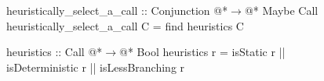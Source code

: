 \documentclass[12pt,a4paper]{report}
\begin{document}
\thispagestyle{empty}
\begin{figure}[h]
\begin{PseudoCode}[moredelim={[is][stringstyle]{@@}{@@}},
  moredelim={[is][\color{dkgreen}\bfseries]{@!}{@!}},
  moredelim={[is][\color{red}\bfseries]{!!}{!!}}]
heuristically_select_a_call :: Conjunction @*$\to$@* Maybe Call
heuristically_select_a_call C = find heuristics C

heuristics :: Call @*$\to$@* Bool
heuristics r = isStatic r || isDeterministic r || isLessBranching r
\end{PseudoCode}
\end{figure}
\end{document}

